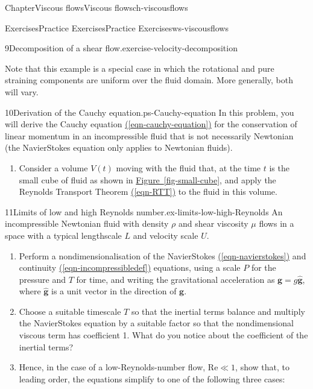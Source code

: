 \documentclass[oneside,10pt,]{book}
\newcommand{\xreffont}{\relax}
\numberwithin{equation}{section}
\newcommand{\bg}{\boldsymbol{g}}
\begin{document}
\begin{chapterptx}{Chapter}{Viscous flows}{}{Viscous flows}{}{}{ch-viscousflows}
\begin{exercises-section}{Exercises}{Practice Exercises}{}{Practice Exercises}{}{}{ws-viscousflows}
\begin{divisionexercise}{9}{Decomposition of a shear flow.}{}{exercise-velocity-decomposition}
\begin{enumerate}[font=\bfseries,label=(\alph*),ref=\alph*]
\par
Note that this example is a special case in which the rotational and pure straining components are uniform over the fluid domain. More generally, both will vary.%
\end{enumerate}%
\end{divisionexercise}%
\begin{divisionexercise}{10}{Derivation of the Cauchy equation.}{}{ps-Cauchy-equation}%
In this problem, you will derive the Cauchy equation \hyperref[eqn-cauchy-equation]{({\xreffont\ref{eqn-cauchy-equation}})} for the conservation of linear momentum in an incompressible fluid that is not necessarily Newtonian (the Navier\textendash{}Stokes equation only applies to Newtonian fluids).%
\begin{enumerate}[font=\bfseries,label=(\alph*),ref=\alph*]%
\item{}Consider a volume \(V(t)\) moving with the fluid that, at the time \(t\) is the small cube of fluid as shown in \hyperref[fig-small-cube]{Figure~{\xreffont\ref{fig-small-cube}}}, and apply the Reynolds Transport Theorem \hyperref[eqn-RTT]{({\xreffont\ref{eqn-RTT}})} to the fluid in this volume.%
\end{enumerate}%
\end{divisionexercise}%
\begin{divisionexercise}{11}{Limits of low and high Reynolds number.}{}{ex-limits-low-high-Reynolds}%
An incompressible Newtonian fluid with density \(\rho\) and shear viscosity \(\mu\) flows in a space with a typical lengthscale \(L\) and velocity scale \(U\).%
\begin{enumerate}[font=\bfseries,label=(\alph*),ref=\alph*]%
\item{}Perform a nondimensionalisation of the Navier\textendash{}Stokes \hyperref[eqn-navierstokes]{({\xreffont\ref{eqn-navierstokes}})} and continuity \hyperref[eqn-incompressibledef]{({\xreffont\ref{eqn-incompressibledef}})} equations, using a scale \(P\) for the pressure and \(T\) for time, and writing the gravitational acceleration as \(\bg=g\hat{\bg}\), where \(\hat{\bg}\) is a unit vector in the direction of \(\bg\).%
\item{}Choose a suitable timescale \(T\) so that the inertial terms balance and multiply the Navier\textendash{}Stokes equation by a suitable factor so that the nondimensional viscous term has coefficient 1. What do you notice about the coefficient of the inertial terms?%
\item{}Hence, in the case of a low-Reynolds-number flow, \(\mathrm{Re}\ll1\), show that, to leading order, the equations simplify to one of the following three cases:%

\end{enumerate}
\end{divisionexercise}
\end{exercises-section}
\end{chapterptx}
\end{document}
